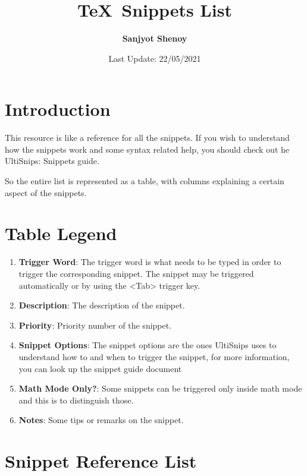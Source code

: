 \documentclass[11pt]{article}
\title{\TeX\, Snippets List}
\author{\textbf{Sanjyot Shenoy}}
\date{Last Update: 22/05/2021}
\theoremstyle{plain}%
\theoremstyle{definition}
\theoremstyle{remark}
\theoremstyle{breakthm}
\theoremstyle{breakdefn}
\theoremstyle{breakrem}
\begin{document}
	\maketitle
	\tableofcontents
	\section{Introduction}
	This resource is like a reference for all the snippets. If you wish to understand how the snippets work and some syntax related help, you should check out he UltiSnips: Snippets guide. \par
	So the entire list is represented as a table, with columns explaining a certain aspect of the snippets.
	\section{Table Legend}
	\begin{enumerate}
		\item\textbf{Trigger Word}: The trigger word is what needs to be typed in order to trigger the corresponding snippet. The snippet may be triggered automatically or by using the <Tab> trigger key.
		\item\textbf{Description}: The description of the snippet.
		\item\textbf{Priority}: Priority number of the snippet.
		\item\textbf{Snippet Options}: The snippet options are the ones UltiSnips uses to understand how to and when to trigger the snippet, for more information, you can look up the snippet guide document
		\item\textbf{Math Mode Only?}: Some snippets can be triggered only inside math mode and this is to distinguish those.
		\item\textbf{Notes}: Some tips or remarks on the snippet.
	\end{enumerate}
	\section{Snippet Reference List}
\end{document}
